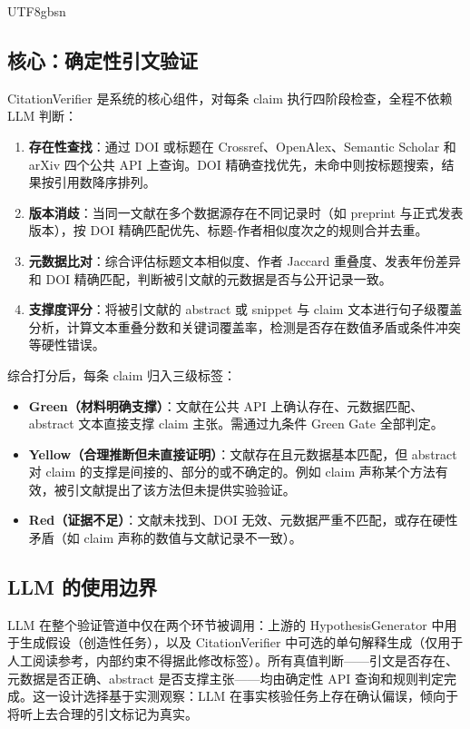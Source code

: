 \documentclass[11pt,a4paper]{article}
\begin{document}
\begin{CJK*}{UTF8}{gbsn}
\subsection{核心：确定性引文验证}

CitationVerifier 是系统的核心组件，对每条 claim 执行四阶段检查，全程不依赖 LLM 判断：

\begin{enumerate}[leftmargin=*,nosep]
  \item \textbf{存在性查找}：通过 DOI 或标题在 Crossref、OpenAlex、Semantic Scholar 和 arXiv 四个公共 API 上查询。DOI 精确查找优先，未命中则按标题搜索，结果按引用数降序排列。
  \item \textbf{版本消歧}：当同一文献在多个数据源存在不同记录时（如 preprint 与正式发表版本），按 DOI 精确匹配优先、标题-作者相似度次之的规则合并去重。
  \item \textbf{元数据比对}：综合评估标题文本相似度、作者 Jaccard 重叠度、发表年份差异和 DOI 精确匹配，判断被引文献的元数据是否与公开记录一致。
  \item \textbf{支撑度评分}：将被引文献的 abstract 或 snippet 与 claim 文本进行句子级覆盖分析，计算文本重叠分数和关键词覆盖率，检测是否存在数值矛盾或条件冲突等硬性错误。
\end{enumerate}

综合打分后，每条 claim 归入三级标签：

\begin{itemize}[leftmargin=*,nosep]
  \item \textbf{Green（材料明确支撑）}：文献在公共 API 上确认存在、元数据匹配、abstract 文本直接支撑 claim 主张。需通过九条件 Green Gate 全部判定。
  \item \textbf{Yellow（合理推断但未直接证明）}：文献存在且元数据基本匹配，但 abstract 对 claim 的支撑是间接的、部分的或不确定的。例如 claim 声称某个方法有效，被引文献提出了该方法但未提供实验验证。
  \item \textbf{Red（证据不足）}：文献未找到、DOI 无效、元数据严重不匹配，或存在硬性矛盾（如 claim 声称的数值与文献记录不一致）。
\end{itemize}

\subsection{LLM 的使用边界}

LLM 在整个验证管道中仅在两个环节被调用：上游的 HypothesisGenerator 中用于生成假设（创造性任务），以及 CitationVerifier 中可选的单句解释生成（仅用于人工阅读参考，内部约束不得据此修改标签）。所有真值判断——引文是否存在、元数据是否正确、abstract 是否支撑主张——均由确定性 API 查询和规则判定完成。这一设计选择基于实测观察：LLM 在事实核验任务上存在确认偏误，倾向于将听上去合理的引文标记为真实。


\end{CJK*}
\end{document}
